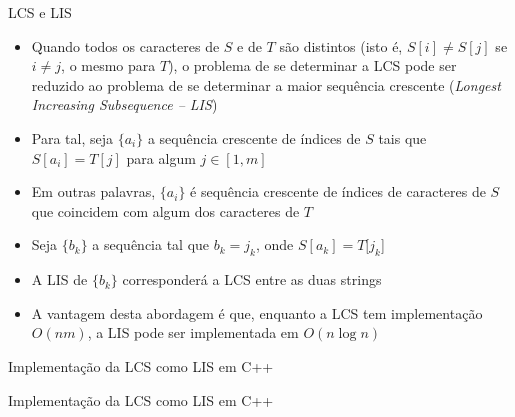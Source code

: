 \begin{frame}[fragile]{LCS e LIS}

    \begin{itemize}
        \item Quando todos os caracteres de $S$ e de $T$ são distintos (isto é, 
            $S[i] \neq S[j]$ se $i \neq j$, o mesmo para $T$), o problema de se determinar a LCS 
            pode ser reduzido ao problema de se determinar a maior sequência crescente 
            (\textit{Longest Increasing Subsequence -- LIS})
        \pause

        \item Para tal, seja $\lbrace a_i\rbrace$ a sequência crescente de índices de $S$ tais que
            $S[a_i] = T[j]$ para algum $j\in [1,m]$
        \pause

        \item Em outras palavras, $\lbrace a_i\rbrace$ é sequência crescente de índices de 
            caracteres de $S$ que coincidem com algum dos caracteres de $T$
        \pause

        \item Seja $\lbrace b_k\rbrace$ a sequência tal que $b_k = j_k$, onde $S[a_k] = T[j_k$] 
        \pause

        \item A LIS de $\lbrace b_k\rbrace$ corresponderá a LCS entre as duas strings
        \pause

        \item A vantagem desta abordagem é que, enquanto a LCS tem implementação $O(nm)$, a LIS 
            pode ser implementada em $O(n \log n)$

    \end{itemize}

\end{frame}



\begin{frame}[fragile]{Implementação da LCS como LIS em C++}
\end{frame}

\begin{frame}[fragile]{Implementação da LCS como LIS em C++}
\end{frame}
